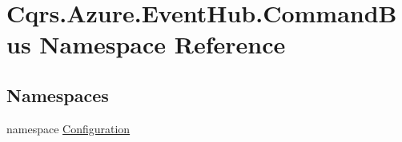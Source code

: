 \hypertarget{namespaceCqrs_1_1Azure_1_1EventHub_1_1CommandBus}{}\section{Cqrs.\+Azure.\+Event\+Hub.\+Command\+Bus Namespace Reference}
\label{namespaceCqrs_1_1Azure_1_1EventHub_1_1CommandBus}
\subsection*{Namespaces}
\begin{DoxyCompactItemize}
\item 
namespace \hyperlink{namespaceCqrs_1_1Azure_1_1EventHub_1_1CommandBus_1_1Configuration}{Configuration}
\end{DoxyCompactItemize}
